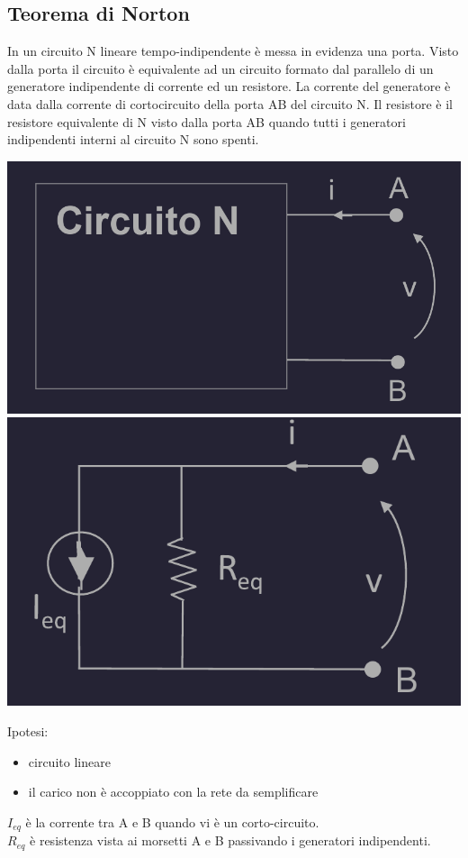 \documentclass{article}
\begin{document}
\subsection{Teorema di Norton}
In un circuito N lineare tempo-indipendente è messa in evidenza una porta. Visto dalla porta
il circuito è equivalente ad un circuito formato dal parallelo di un generatore indipendente di
corrente ed un resistore. La corrente del generatore è data dalla corrente di cortocircuito della porta AB del circuito N. Il resistore è il resistore equivalente di N visto dalla porta AB quando tutti i generatori indipendenti interni al circuito N sono spenti.
\begin{center}
    \includegraphics[scale=0.3]{Image/Norton_1.png}
    \includegraphics[scale=0.3]{Image/Norton_2.png}
\end{center}
Ipotesi:
\begin{itemize}
    \item circuito lineare
    \item il carico non è accoppiato con la rete da semplificare
\end{itemize}
$I_{eq}$ è la corrente tra A e B quando vi è un corto-circuito.\\
$R_{eq}$ è resistenza vista ai morsetti A e B passivando i generatori indipendenti.
\end{document}
